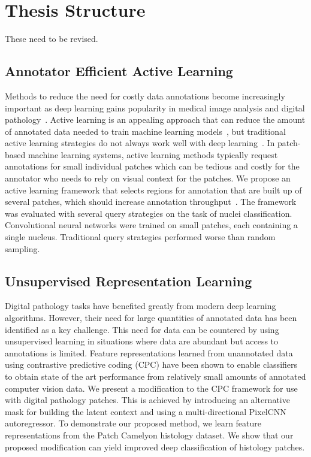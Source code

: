 \section{Thesis Structure}
\label{sec:thesis_structure}
These need to be revised.

\subsection*{Annotator Efficient Active Learning}
Methods to reduce the need for costly data annotations become increasingly important as deep learning gains popularity in medical image analysis and digital pathology~\citep{tizhoosh2018artificial}. Active learning is an appealing approach that can reduce the amount of annotated data needed to train machine learning models~\citep{settles2012active}, but traditional active learning strategies do not always work well with deep learning~\citep{wang2016cost}. In patch-based machine learning systems, active learning methods typically request annotations for small individual patches which can be tedious and costly for the annotator who needs to rely on visual context for the patches. We propose an active learning framework that selects regions for annotation that are built up of several patches, which should increase annotation throughput~\citep{carse2019active}. The framework was evaluated with several query strategies on the task of nuclei classification. Convolutional neural networks were trained on small patches, each containing a single nucleus. Traditional query strategies performed worse than random sampling.

\subsection*{Unsupervised Representation Learning}
Digital pathology tasks have benefited greatly from modern deep learning algorithms. However, their need for large quantities of annotated data has been identified as a key challenge. This need for data can be countered by using unsupervised learning in situations where data are abundant but access to annotations is limited. Feature representations learned from unannotated data using contrastive predictive coding (CPC) have been shown to enable classifiers to obtain state of the art performance from relatively small amounts of annotated computer vision data. We present a modification to the CPC framework for use with digital pathology patches. This is achieved by introducing an alternative mask for building the latent context and using a multi-directional PixelCNN autoregressor. To demonstrate our proposed method, we learn feature representations from the Patch Camelyon histology dataset. We show that our proposed modification can yield improved deep classification of histology patches.

